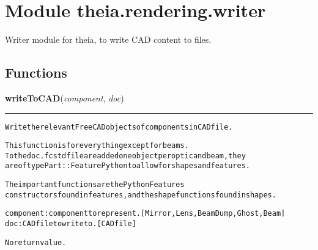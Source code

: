 %
%
%


\section{Module theia.rendering.writer}

    \label{theia:rendering:writer}
Writer module for theia, to write CAD content to files.



  \subsection{Functions}

    \label{theia:rendering:writer:writeToCAD}

    \vspace{0.5ex}

\hspace{.8\funcindent}\begin{boxedminipage}{\funcwidth}

    \raggedright \textbf{writeToCAD}(\textit{component}, \textit{doc})

    \vspace{-1.5ex}

    \rule{\textwidth}{0.5\fboxrule}
\setlength{\parskip}{2ex}
\begin{alltt}
Write the relevant FreeCAD objects of components in CAD file.

This function is for everything except for beams.
To the doc .fcstd file are added one object per optic and beam, they
    are of type Part::FeaturePython to allow for shapes and features.

The important functions are the PythonFeatures
    constructors found in features, and the shape functions found in shapes.

component: component to represent. [Mirror, Lens, BeamDump, Ghost, Beam]
doc: CAD file to write to. [CAD file]

No return value.
\end{alltt}

\setlength{\parskip}{1ex}
    \end{boxedminipage}

